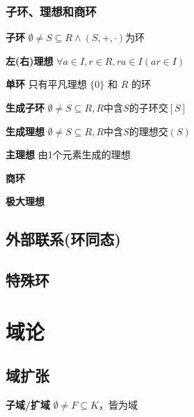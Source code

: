 \documentclass[a4paper,10pt]{ctexart}
\newcommand*{\genring}[1]{[#1]}
\newcommand*{\genideal}[1]{(#1)}
\begin{document}
\begin{multicols}{3}
    \subsubsection{子环、理想和商环}

    \textbf{子环} $\emptyset \!\neq\! S \!\subseteq\! R \wedge (S, +, \cdot)$为环

    \begin{theorem}[子环判则]

    \end{theorem}

    \begin{theorem}[子环运算律]

    \end{theorem}

    \textbf{左(右)理想} $\forall a \in I, r \in R, ra \in I (ar \in I)$

    \begin{theorem}[理想判则]

    \end{theorem}

    \textbf{单环} 只有平凡理想 $\{0\}$ 和 $R$ 的环

    \textbf{生成子环} $\emptyset \!\neq\! S \!\subseteq\! R, R$中含$\!S\!$的子环交$\genring{S}$

    \textbf{生成理想} $\emptyset \!\neq\! S \!\subseteq\! R, R$中含$\!S\!$的理想交$\genideal{S}$

    \textbf{主理想} 由1个元素生成的理想

    \textbf{商环}

    \textbf{极大理想}

    \subsection{外部联系(环同态)}

    \subsection{特殊环}

    \section{域论}

    \subsection{域扩张}

    \textbf{子域/扩域} $\emptyset \ne F \subseteq K$，皆为域


\end{multicols}
\end{document}
